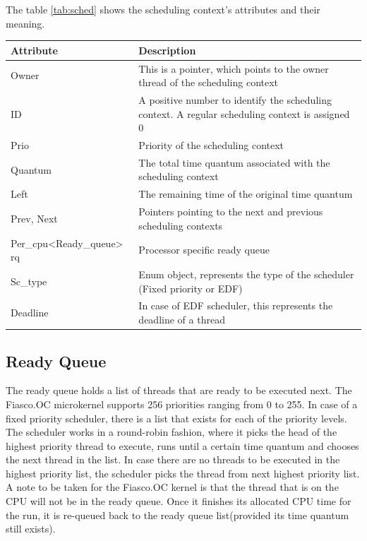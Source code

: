 The table \ref{tab:sched} shows the scheduling context's attributes and their meaning.
\begin{center}
\begin{tabular}{|l|p{9cm}|}
\hline 
\textbf{Attribute} & \textbf{Description} \\ \hline

Owner & This is a pointer, which points to the owner thread of the scheduling context\\ \hline

ID & A positive number to identify the scheduling context. A regular scheduling context is assigned 0
\\ \hline

Prio & Priority of the scheduling context \\ \hline

Quantum &  The total time quantum associated with the scheduling context\\ \hline

Left & The remaining time of the original time quantum \\ \hline

Prev, Next & Pointers pointing to the next and previous scheduling contexts \\ \hline

Per\_cpu<Ready\_queue> rq &  Processor specific ready queue \\ \hline

Sc\_type & Enum object, represents the type of the scheduler (Fixed priority or EDF) \\ \hline

Deadline & In case of EDF scheduler, this represents the deadline of a thread \\ \hline
\end{tabular}
\label{tab:sched}
\end{center}

\subsection{Ready Queue}\label{Foundations:rq}
The ready queue holds a list of threads that are ready to be executed next. The Fiasco.OC microkernel supports 256 priorities ranging from 0 to 255. In case of a fixed priority scheduler, there is a list that exists for each of the priority levels. The scheduler works in a round-robin fashion, where it picks the head of the highest priority thread to execute, runs until a certain time quantum and chooses the next thread in the list. In case there are no threads to be executed in the highest priority list, the scheduler picks the thread from next highest priority list. 
A note to be taken for the Fiasco.OC kernel is that the thread that is on the CPU will not be in the ready queue. Once it finishes its allocated CPU time for the run, it is re-queued back to the ready queue list(provided its time quantum still exists).

